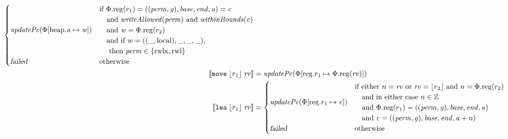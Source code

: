 \documentclass[a4paper]{article}
\newcommand{\update}[2]{[#1 \mapsto #2]}
\newcommand{\sem}[1]{\left\llbracket #1 \right\rrbracket}
\newcommand{\var}[1]{\mathit{#1}}
\newcommand{\rv}{\var{rv}}
\newcommand{\gl}{\var{g}}
\newcommand{\addr}{\var{a}}
\newcommand{\start}{\var{base}}
\newcommand{\addrend}{\var{end}}
\newcommand{\perm}{\var{perm}}
\newcommand{\stdcap}[1][(\perm,\gl)]{\left(#1,\start,\addrend,\addr \right)}
\newcommand{\plainproj}[1]{\mathrm{#1}}
\newcommand{\memreg}[1][\Phi]{#1.\plainproj{reg}}
\newcommand{\updateHeap}[3][\Phi]{#1\update{\plainproj{heap}.#2}{#3}}
\newcommand{\updateReg}[3][\Phi]{#1\update{\plainproj{reg}.#2}{#3}}
\newcommand{\failed}{\textsl{failed}}
\newcommand{\plainfun}[2]{
  \ifthenelse{\equal{#2}{}}
             {\mathit{#1}}
             {\mathit{#1}(#2)}
}
\newcommand{\writeAllowed}[1]{\plainfun{writeAllowed}{#1}}
\newcommand{\withinBounds}[1]{\plainfun{withinBounds}{#1}}
\newcommand{\stdUpdatePc}[1]{\plainfun{updatePc}{#1}}
\newcommand{\ints}{\mathbb{Z}}
\newcommand{\refreg}[1]{\lfloor #1 \rfloor}
\newcommand{\zinstr}[1]{\mathtt{#1}}
\newcommand{\twoinstr}[3]{\zinstr{#1} \; #2 \; #3}
\newcommand{\move}[2]{\twoinstr{move}{#1}{#2}}
\newcommand{\lea}[2]{\twoinstr{lea}{#1}{#2}}
\newcommand{\plainperm}[1]{\mathrm{#1}}
\newcommand{\readwritel}{\plainperm{rwl}}
\newcommand{\rwlx}{\plainperm{rwlx}}
\newcommand{\local}{\plainperm{local}}
\begin{document}
\begin{align*}
\begin{cases}
                                               \stdUpdatePc{\updateHeap{\addr}{\var{w}}} &
                                               \arraycolsep=0pt
                                               \begin{array}{l}
                                                 \text{if }\memreg(r_1) = \stdcap = \var{c} \\
                                                 \quad\text{and }\writeAllowed{\perm} \text{ and } \withinBounds{\var{c}} \\
                                                 \quad\text{and }\var{w} = \memreg(r_2)\\
                                                 \quad\text{and if } \var{w} = ((\_,\local),\_,\_,\_) \text{,} \\
                                                 \quad\text{ then } \perm \in \{\rwlx,\readwritel \}
                                               \end{array}\\
                                               \failed & \text{otherwise }
                                             \end{cases}\\
 \sem{\move{\refreg{r_1}}{\rv}}            & = \stdUpdatePc{\updateReg{r_1}{\memreg(\rv)}}
\\
  \sem{\lea{\refreg{r_1}}{\rv}}            & =
                                             \begin{cases}
                                               \stdUpdatePc{\updateReg{r_1}{\var{c}}} &
                                                 \arraycolsep=0pt
                                                 \begin{array}{l}
                                                   \text{if either $n = \rv$ or $\rv = \refreg{r_2}$ and $n = \memreg(r_2)$} \\
                                                   \quad\text{and in either case $n \in \ints $} \\
                                                   \quad\text{and $\memreg(r_1) = \stdcap$}\\
                                                   \quad\text{and $\var{c} = ((\perm,\gl),\start,\addrend,\addr + n)$}
                                                 \end{array}\\
                                               \failed               & \text{otherwise}

\end{cases}
\end{align*}
\end{document}
